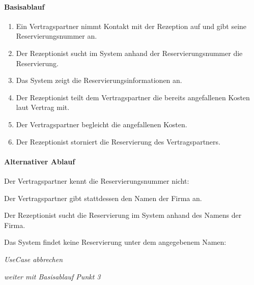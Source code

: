 \paragraph{Basisablauf}
\begin{enumerate}
\item Ein \Gls{Vertragspartner} nimmt Kontakt mit der \Gls{Rezeption} auf und gibt seine \Gls{Reservierungsnummer} an.
\item Der \Gls{Rezeptionist} sucht im System anhand der \Gls{Reservierungsnummer} die \Gls{Reservierung}.
\item Das System zeigt die Reservierungsinformationen an.
\item Der \Gls{Rezeptionist} teilt dem \Gls{Vertragspartner} die bereits angefallenen Kosten laut Vertrag mit.
\item Der \Gls{Vertragspartner} begleicht die angefallenen Kosten.
\item Der \Gls{Rezeptionist} storniert die Reservierung des \Gls{Vertragspartner}s.
\end{enumerate}

\paragraph{Alternativer Ablauf}
\begin{longenum}
	\item
	\begin{longenum}
		\item Der \Gls{Vertragspartner} kennt die \Gls{Reservierungsnummer} nicht:
		\begin{longenum}
			\item Der \Gls{Vertragspartner} gibt stattdessen den Namen der Firma an.
			\item Der \Gls{Rezeptionist} sucht die \Gls{Reservierung} im System anhand des Namens der Firma.
			\begin{longenum}
				\item Das System findet keine \Gls{Reservierung} unter dem angegebenem Namen:
				\begin{longenum}
					\item \emph{UseCase abbrechen}
				\end{longenum}
			\end{longenum}
			\item \emph{weiter mit Basisablauf Punkt 3}
		\end{longenum}
	\end{longenum}
	
	\item
	\item
	\item
	\item
\end{longenum}

